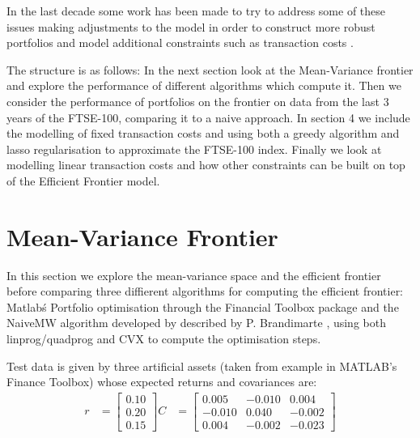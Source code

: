 \documentclass[a4paper,10pt, twocolumn]{article}
\begin{document}
In the last decade some work has been made to try to address some of these issues making adjustments to the model in order to construct more robust portfolios and model additional constraints such as transaction costs \cite{Regularisation}. 

The structure is as follows: In the next section look at the Mean-Variance frontier and explore the performance of different algorithms which compute it. Then we consider the performance of portfolios on the frontier on data from the last 3 years of the FTSE-100, comparing it to a naive approach. In section 4 we include the modelling of fixed transaction costs and using both a greedy algorithm and lasso regularisation to approximate the FTSE-100 index. Finally we look at modelling linear transaction costs and how other constraints can be built on top of the Efficient Frontier model. 

\section{Mean-Variance Frontier}
In this section we explore the mean-variance space and the efficient frontier before comparing three diffierent algorithms for computing the efficient frontier: Matlab\'s Portfolio optimisation through the Financial Toolbox package \cite{Matlab} and the NaiveMW algorithm developed by described by P. Brandimarte \cite{TextBook}, using both linprog/quadprog and CVX \cite{CVX} to compute the optimisation steps.  

Test data is given by three artificial assets (taken from example in MATLAB's Finance Toolbox) whose expected returns and covariances are:
\begin{align}
r &= 
  \begin{bmatrix}
  0.10 \\ 0.20 \\ 0.15
  \end{bmatrix} 
C &=
  \begin{bmatrix}
     0.005 & -0.010 &  0.004 \\
    -0.010 &  0.040 & -0.002 \\
     0.004 & -0.002 & -0.023
  \end{bmatrix}
  \label{eq1}
\end{align}
\end{document}

